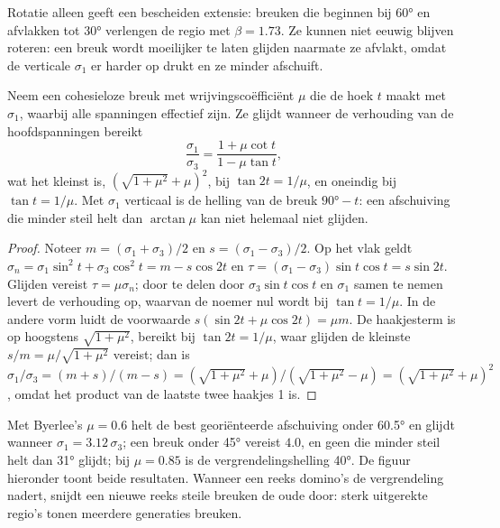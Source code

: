 Rotatie alleen geeft een bescheiden extensie: breuken die beginnen bij \ang{60} en
afvlakken tot \ang{30} verlengen de regio met $\beta = 1.73$. Ze kunnen niet
eeuwig blijven roteren: een breuk wordt moeilijker te laten glijden naarmate ze afvlakt, omdat de verticale
$\sigma_1$ er harder op drukt en ze minder afschuift.

\begin{proposition}\label{prop:b3:extension-strike-slip:lockup}
Neem een cohesieloze breuk met wrijvingscoëfficiënt $\mu$ die de hoek
$t$ maakt met $\sigma_1$, waarbij alle spanningen effectief zijn. Ze glijdt wanneer de verhouding van de
hoofdspanningen bereikt
\[
  \frac{\sigma_1}{\sigma_3} = \frac{1 + \mu\cot t}{1 - \mu\tan t} ,
\]
wat het kleinst is, $(\sqrt{1 + \mu^2} + \mu)^2$, bij $\tan2t = 1/\mu$, en
oneindig bij $\tan t = 1/\mu$. Met $\sigma_1$ verticaal is de helling van de breuk
$\ang{90} - t$: een afschuiving die minder steil helt dan $\arctan\mu$ kan niet
helemaal niet glijden.
\end{proposition}

\begin{proof}
Noteer $m = (\sigma_1 + \sigma_3)/2$ en $s = (\sigma_1 - \sigma_3)/2$. Op
het vlak geldt $\sigma_n = \sigma_1\sin^2t + \sigma_3\cos^2t = m - s\cos2t$ en
$\tau = (\sigma_1 - \sigma_3)\sin t\cos t = s\sin2t$. Glijden vereist $\tau =
\mu\sigma_n$; door te delen door $\sigma_3\sin t\cos t$ en $\sigma_1$ samen te nemen
levert de verhouding op, waarvan de noemer nul wordt bij $\tan t = 1/\mu$. In de andere
vorm luidt de voorwaarde $s(\sin2t + \mu\cos2t) = \mu m$. De haakjesterm is op
hoogstens $\sqrt{1 + \mu^2}$, bereikt bij $\tan2t = 1/\mu$, waar glijden de
kleinste $s/m = \mu/\sqrt{1 + \mu^2}$ vereist; dan is $\sigma_1/\sigma_3 = (m + s)/(m - s) =
(\sqrt{1 + \mu^2} + \mu)/(\sqrt{1 + \mu^2} - \mu) = (\sqrt{1 + \mu^2} +
\mu)^2$, omdat het product van de laatste twee haakjes 1 is.
\end{proof}

Met Byerlee's $\mu = 0.6$ helt de best georiënteerde afschuiving onder \ang{60.5} en
glijdt wanneer $\sigma_1 = 3.12\,\sigma_3$; een breuk onder \ang{45} vereist $4.0$, en
geen die minder steil helt dan \ang{31} glijdt; bij $\mu = 0.85$ is de vergrendelingshelling
\ang{40}. De figuur hieronder toont beide resultaten. Wanneer een reeks domino's de
vergrendeling nadert, snijdt een nieuwe reeks steile breuken de oude door: sterk uitgerekte regio's
tonen meerdere generaties breuken.

